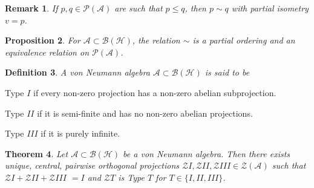 \documentclass[aps,preprint]{revtex4}%
\newtheorem{theorem}{Theorem}
\newtheorem{definition}[theorem]{Definition}
\newtheorem{proposition}[theorem]{Proposition}
\newtheorem{remark}[theorem]{Remark}
\begin{document}
\begin{remark}
If $p,q\in\mathcal{P}(\mathcal{A})$ are such that $p\leq q$, then $p\sim q$
with partial isometry $v=p$.
\end{remark}

\begin{proposition}
For $\mathcal{A}\subset\mathcal{B}(\mathcal{H})$, the relation $\sim$ is a
partial ordering and an equivalence relation on $\mathcal{P}(\mathcal{A})$.
\end{proposition}

\begin{definition}
A von Neumann algebra $\mathcal{A}\subset\mathcal{B}(\mathcal{H})$ is said to be
\end{definition}

\textbullet\qquad Type $I$ if every non-zero projection has a non-zero abelian subprojection.

\textbullet\qquad Type $II$ if it is semi-finite and has no non-zero abelian projections.

\textbullet\qquad Type $III$ if it is purely infinite.

\begin{theorem}
Let $\mathcal{A}\subset\mathcal{B}(\mathcal{H})$ be a von Neumann algebra.
Then there exists unique, central, pairwise orthogonal projections
$\mathcal{Z}I,\mathcal{Z}II,\mathcal{Z}III\in\mathcal{Z}(\mathcal{A})$ such
that $\mathcal{Z}I+\mathcal{Z}II+\mathcal{Z}III$ $=I$ and $\mathcal{Z}T$ is
Type $T$ for $T\in\{I,II,III\}$.
\end{theorem}
\end{document}
